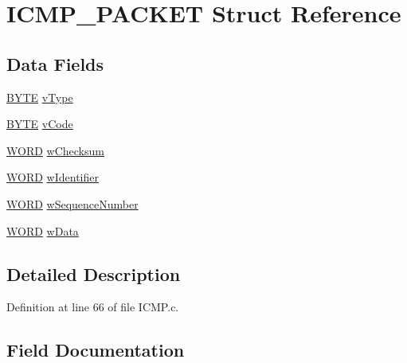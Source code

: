 \hypertarget{struct_i_c_m_p___p_a_c_k_e_t}{}\section{I\+C\+M\+P\+\_\+\+P\+A\+C\+K\+E\+T Struct Reference}
\label{struct_i_c_m_p___p_a_c_k_e_t}
\subsection*{Data Fields}
\begin{DoxyCompactItemize}
\item 
\hyperlink{_generic_type_defs_8h_a4ae1dab0fb4b072a66584546209e7d58}{B\+Y\+T\+E} \hyperlink{struct_i_c_m_p___p_a_c_k_e_t_a3ba68f85c86b06e62ae281818ef865ea}{v\+Type}
\item 
\hyperlink{_generic_type_defs_8h_a4ae1dab0fb4b072a66584546209e7d58}{B\+Y\+T\+E} \hyperlink{struct_i_c_m_p___p_a_c_k_e_t_afa2682a4e854bff2bebfdd544b28cf27}{v\+Code}
\item 
\hyperlink{_generic_type_defs_8h_a2b0e863dadf920709ec53d9088ee7c91}{W\+O\+R\+D} \hyperlink{struct_i_c_m_p___p_a_c_k_e_t_a2675f57135275c1b6e32c45387be4e05}{w\+Checksum}
\item 
\hyperlink{_generic_type_defs_8h_a2b0e863dadf920709ec53d9088ee7c91}{W\+O\+R\+D} \hyperlink{struct_i_c_m_p___p_a_c_k_e_t_a080ff6e97e0202c75a71a9b6ffe7abc7}{w\+Identifier}
\item 
\hyperlink{_generic_type_defs_8h_a2b0e863dadf920709ec53d9088ee7c91}{W\+O\+R\+D} \hyperlink{struct_i_c_m_p___p_a_c_k_e_t_ab5b9f6edb6e4c1fb9986f4ce69641367}{w\+Sequence\+Number}
\item 
\hyperlink{_generic_type_defs_8h_a2b0e863dadf920709ec53d9088ee7c91}{W\+O\+R\+D} \hyperlink{struct_i_c_m_p___p_a_c_k_e_t_a3cd95b4fce590a248e15f498a2ac9d8f}{w\+Data}
\end{DoxyCompactItemize}


\subsection{Detailed Description}


Definition at line 66 of file I\+C\+M\+P.\+c.



\subsection{Field Documentation}
\hypertarget{struct_i_c_m_p___p_a_c_k_e_t_afa2682a4e854bff2bebfdd544b28cf27}{}
